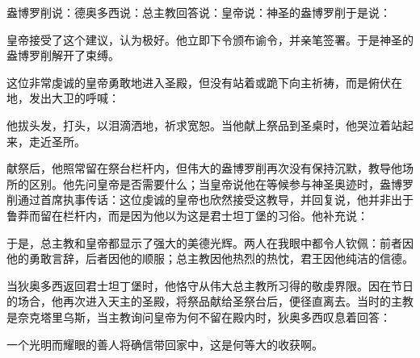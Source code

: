 盎博罗削说：德奥多西说：总主教回答说：皇帝说：神圣的盎博罗削于是说：\par

皇帝接受了这个建议，认为极好。他立即下令颁布谕令，并亲笔签署。于是神圣的盎博罗削解开了束缚。\par

这位非常虔诚的皇帝勇敢地进入圣殿，但没有站着或跪下向主祈祷，而是俯伏在地，发出大卫的呼喊：\par

他拔头发，打头，以泪滴洒地，祈求宽恕。当他献上祭品到圣桌时，他哭泣着站起来，走近圣所。\par

献祭后，他照常留在祭台栏杆内，但伟大的盎博罗削再次没有保持沉默，教导他场所的区别。他先问皇帝是否需要什么；当皇帝说他在等候参与神圣奥迹时，盎博罗削通过首席执事传话：这位虔诚的皇帝也欣然接受这教导，并回复说，他并非出于鲁莽而留在栏杆内，而是因为他以为这是君士坦丁堡的习俗。他补充说：\par

于是，总主教和皇帝都显示了强大的美德光辉。两人在我眼中都令人钦佩：前者因他的勇敢言辞，后者因他的顺服；总主教因他热烈的热忱，君王因他纯洁的信德。\par

当狄奥多西返回君士坦丁堡时，他恪守从伟大总主教所习得的敬虔界限。因在节日的场合，他再次进入天主的圣殿，将祭品献给圣祭台后，便径直离去。当时的主教是奈克塔里乌斯，当主教询问皇帝为何不留在殿内时，狄奥多西叹息着回答：\par

一个光明而耀眼的善人将确信带回家中，这是何等大的收获啊。\par

